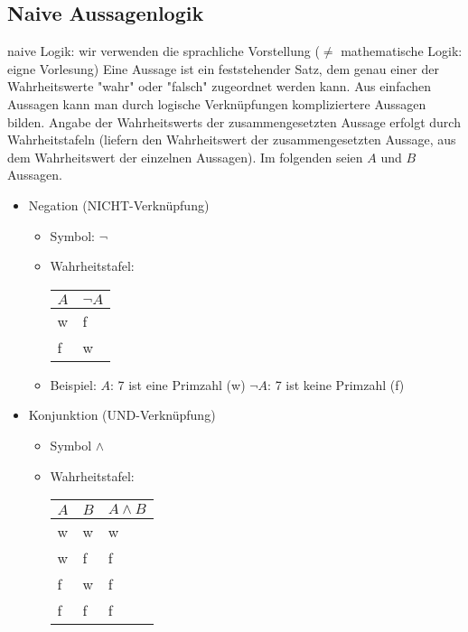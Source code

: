 \documentclass[a4paper]{scrartcl}
\theoremstyle{definition}
\theoremstyle{plain}
\theoremstyle{plain}
\theoremstyle{remark}
\theoremstyle{remark}
\theoremstyle{remark}
\theoremstyle{remark}
\theoremstyle{remark}
\begin{document}
\subsection{Naive Aussagenlogik}
\label{sec-2-1}
naive Logik: wir verwenden die sprachliche Vorstellung ($\neq$ mathematische Logik: eigne Vorlesung)
Eine Aussage ist ein feststehender Satz, dem genau einer der Wahrheitswerte "wahr" oder "falsch" zugeordnet werden kann.
Aus einfachen Aussagen kann man durch logische Verknüpfungen kompliziertere Aussagen bilden.
Angabe der Wahrheitswerts der zusammengesetzten Aussage erfolgt durch Wahrheitstafeln (liefern den Wahrheitswert der zusammengesetzten Aussage, aus dem Wahrheitswert der einzelnen Aussagen).
Im folgenden seien $A$ und $B$ Aussagen.
\begin{itemize}
\item Negation (NICHT-Verknüpfung)
\begin{itemize}
\item Symbol: $\neg$
\item Wahrheitstafel:
\begin{center}
\begin{tabular}{ll}
$A$ & $\neg A$\\
\hline
w & f\\
f & w\\
\end{tabular}
\end{center}
\item Beispiel: $A$: 7 ist eine Primzahl (w)
$\neg A$: 7 ist keine Primzahl (f)
\end{itemize}

\item Konjunktion (UND-Verknüpfung)
\begin{itemize}
\item Symbol $\wedge$
\item Wahrheitstafel:
\begin{center}
\begin{tabular}{lll}
$A$ & $B$ & $A\wedge B$\\
\hline
w & w & w\\
w & f & f\\
f & w & f\\
f & f & f\\
\end{tabular}
\end{center}
\end{itemize}


\end{itemize}
\end{document}
